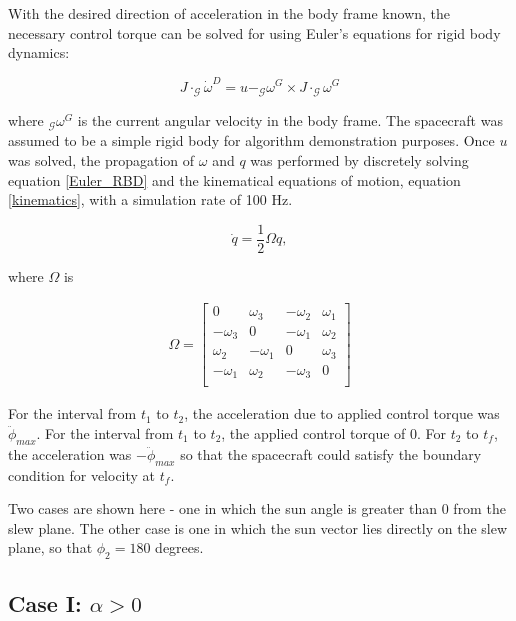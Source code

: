 \documentclass[letterpaper, preprint, paper,11pt]{AAS}	%
\begin{document}
With the desired direction of acceleration in the body frame known, the necessary control torque can be solved for using Euler's equations for rigid body dynamics:

\begin{equation} \label{Euler_RBD}
J \cdot _\mathcal{G}\dot{\omega}^D = u - _\mathcal{G}\omega^G \times J \cdot _\mathcal{G}\omega^G
\end{equation} 

where $_\mathcal{G}\omega^G$ is the current angular velocity in the body frame. The spacecraft was assumed to be a simple rigid body for algorithm demonstration purposes. Once $u$ was solved, the propagation of $\omega$ and $q$ was performed by discretely solving equation \ref{Euler_RBD} and the kinematical equations of motion, equation \ref{kinematics}, with a simulation rate of 100 Hz. 

\begin{equation} \label{kinematics}
			\dot{q} = \frac{1}{2} \Omega q, 
\end{equation}

where $\Omega$ is 

\begin{gather}
	\Omega 
	=
	\begin{bmatrix}
	0 & \omega_3 & -\omega_2 & \omega_1 \\
	-\omega_3 & 0 & -\omega_1 & \omega_2 \\
	\omega_2 & -\omega_1 & 0 & \omega_3 \\ 
	-\omega_1 & \omega_2 & -\omega_3 & 0 \\ 
	\end{bmatrix}
\end{gather}

For the interval from $t_1$ to $t_2$, the acceleration due to applied control torque was $\ddot{\phi}_{max}$. For the interval from $t_1$ to $t_2$, the applied control torque of 0. For $t_2$ to $t_f$, the acceleration was $-\ddot{\phi}_{max}$ so that the spacecraft could satisfy the boundary condition for velocity at $t_f$. 

Two cases are shown here - one in which the sun angle is greater than 0 from the slew plane. The other case is one in which the sun vector lies directly on the slew plane, so that $\phi_2 = 180$ degrees. 

\subsection{Case I: $\alpha > 0$} 
\end{document}
